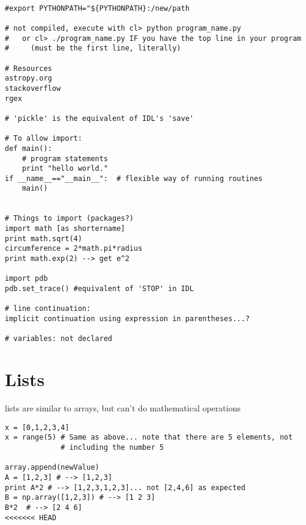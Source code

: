 \documentclass{article}
\begin{document}
\begin{verbatim}

#export PYTHONPATH="${PYTHONPATH}:/new/path

# not compiled, execute with cl> python program_name.py
#   or cl> ./program_name.py IF you have the top line in your program
#     (must be the first line, literally)

# Resources
astropy.org
stackoverflow
rgex

# 'pickle' is the equivalent of IDL's 'save'

# To allow import:
def main():
    # program statements
    print "hello world."
if __name__=="__main__":  # flexible way of running routines
    main()


# Things to import (packages?)
import math [as shortername]
print math.sqrt(4)
circumference = 2*math.pi*radius
print math.exp(2) --> get e^2

import pdb
pdb.set_trace() #equivalent of 'STOP' in IDL

# line continuation:
implicit continuation using expression in parentheses...?

# variables: not declared
\end{verbatim}

\section*{Lists}

lists are similar to arrays, but can't do mathematical operations
\begin{verbatim}
x = [0,1,2,3,4]
x = range(5) # Same as above... note that there are 5 elements, not
             # including the number 5

array.append(newValue)
A = [1,2,3] # --> [1,2,3]
print A*2 # --> [1,2,3,1,2,3]... not [2,4,6] as expected
B = np.array([1,2,3]) # --> [1 2 3]
B*2  # --> [2 4 6]
<<<<<<< HEAD
\end{verbatim}
\end{document}
